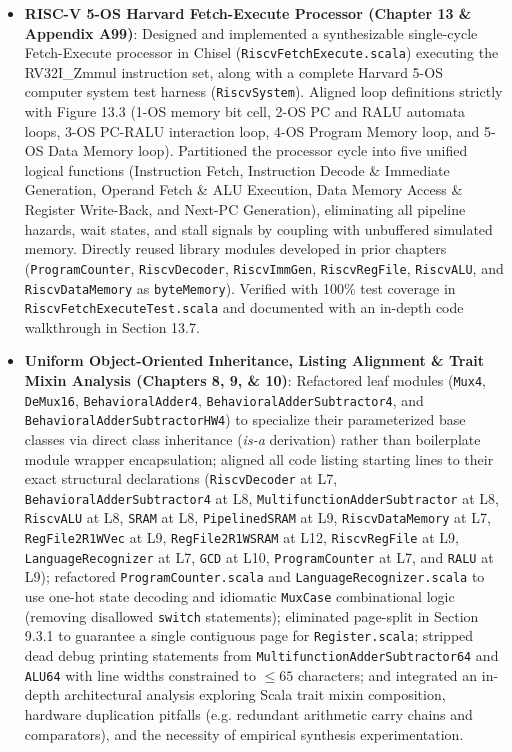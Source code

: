 \begin{itemize}
    \item \textbf{RISC-V 5-OS Harvard Fetch-Execute Processor (Chapter 13 \& Appendix A99)}: Designed and implemented a synthesizable single-cycle Fetch-Execute processor in Chisel (\texttt{RiscvFetchExecute.scala}) executing the RV32I\_Zmmul instruction set, along with a complete Harvard 5-OS computer system test harness (\texttt{RiscvSystem}). Aligned loop definitions strictly with Figure 13.3 (1-OS memory bit cell, 2-OS PC and RALU automata loops, 3-OS PC-RALU interaction loop, 4-OS Program Memory loop, and 5-OS Data Memory loop). Partitioned the processor cycle into five unified logical functions (Instruction Fetch, Instruction Decode \& Immediate Generation, Operand Fetch \& ALU Execution, Data Memory Access \& Register Write-Back, and Next-PC Generation), eliminating all pipeline hazards, wait states, and stall signals by coupling with unbuffered simulated memory. Directly reused library modules developed in prior chapters (\texttt{ProgramCounter}, \texttt{RiscvDecoder}, \texttt{RiscvImmGen}, \texttt{RiscvRegFile}, \texttt{RiscvALU}, and \texttt{RiscvDataMemory} as \texttt{byteMemory}). Verified with 100\% test coverage in \texttt{RiscvFetchExecuteTest.scala} and documented with an in-depth code walkthrough in Section 13.7.
    \item \textbf{Uniform Object-Oriented Inheritance, Listing Alignment \& Trait Mixin Analysis (Chapters 8, 9, \& 10)}: Refactored leaf modules (\texttt{Mux4}, \texttt{DeMux16}, \texttt{BehavioralAdder4}, \texttt{BehavioralAdderSubtractor4}, and \texttt{BehavioralAdderSubtractorHW4}) to specialize their parameterized base classes via direct class inheritance (\textit{is-a} derivation) rather than boilerplate module wrapper encapsulation; aligned all code listing starting lines to their exact structural declarations (\texttt{RiscvDecoder} at L7, \texttt{BehavioralAdderSubtractor4} at L8, \texttt{MultifunctionAdderSubtractor} at L8, \texttt{RiscvALU} at L8, \texttt{SRAM} at L8, \texttt{PipelinedSRAM} at L9, \texttt{RiscvDataMemory} at L7, \texttt{RegFile2R1WVec} at L9, \texttt{RegFile2R1WSRAM} at L12, \texttt{RiscvRegFile} at L9, \texttt{LanguageRecognizer} at L7, \texttt{GCD} at L10, \texttt{ProgramCounter} at L7, and \texttt{RALU} at L9); refactored \texttt{ProgramCounter.scala} and \texttt{LanguageRecognizer.scala} to use one-hot state decoding and idiomatic \texttt{MuxCase} combinational logic (removing disallowed \texttt{switch} statements); eliminated page-split in Section 9.3.1 to guarantee a single contiguous page for \texttt{Register.scala}; stripped dead debug printing statements from \texttt{MultifunctionAdderSubtractor64} and \texttt{ALU64} with line widths constrained to $\le 65$ characters; and integrated an in-depth architectural analysis exploring Scala trait mixin composition, hardware duplication pitfalls (e.g. redundant arithmetic carry chains and comparators), and the necessity of empirical synthesis experimentation.

\end{itemize}
